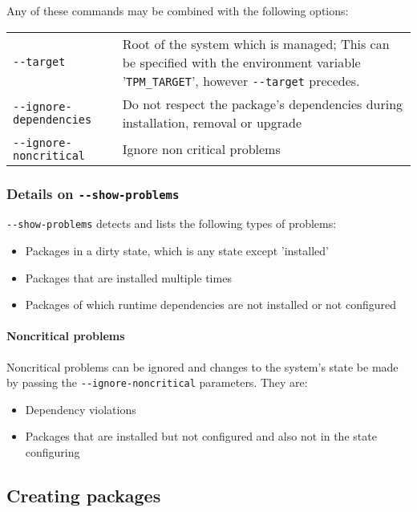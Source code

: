 \documentclass[a4paper]{article}
\newcommand{\variable}[1]{'\texttt{#1}'}
\begin{document}
	\vspace{1em}
	Any of these commands may be combined with the following options: \\
	\bgroup
	\def\arraystretch{1.5}
	\begin{tabularx}{\textwidth}{lX}
		\texttt{-{}-target} & Root of the system which is managed; This can be specified with the environment variable \variable{TPM\_TARGET}, however \texttt{-{}-target} precedes. \\
		
		\texttt{-{}-ignore-dependencies} & Do not respect the package's dependencies during installation, removal or upgrade \\
		
		\texttt{-{}-ignore-noncritical} & Ignore non critical problems \\
	\end{tabularx}
	\egroup
	
	\subsubsection{Details on \texttt{-{}-show-problems}}
	
	\texttt{-{}-show-problems} detects and lists the following types of problems:
	
	\noindent
	\begin{itemize}
		\item Packages in a dirty state, which is any state except 'installed'
		\item Packages that are installed multiple times
		\item Packages of which runtime dependencies are not installed or not configured
	\end{itemize}

	\paragraph{Noncritical problems} Noncritical problems can be ignored and changes to the system's state be made by passing the \texttt{-{}-ignore-noncritical} parameters. They are:
	
	\noindent
	\begin{itemize}
		\item Dependency violations
		\item Packages that are installed but not configured and also not in the state configuring
	\end{itemize}
	
	\subsection{Creating packages}
	\label{sec:creating_packages}
	
\end{document}
